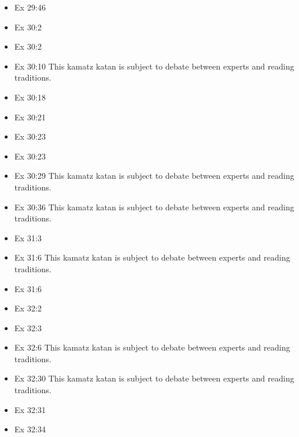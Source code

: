 \documentclass[14pt]{article}
\begin{document}
\begin{multicols}{2}
\begin{itemize}
\item Ex 29:46

\item Ex 30:2

\item Ex 30:2

\item Ex 30:10 This kamatz katan is subject to debate between experts and reading traditions.

\item Ex 30:18

\item Ex 30:21

\item Ex 30:23

\item Ex 30:23

\item Ex 30:29 This kamatz katan is subject to debate between experts and reading traditions.

\item Ex 30:36 This kamatz katan is subject to debate between experts and reading traditions.

\item Ex 31:3

\item Ex 31:6 This kamatz katan is subject to debate between experts and reading traditions.

\item Ex 31:6

\item Ex 32:2

\item Ex 32:3

\item Ex 32:6 This kamatz katan is subject to debate between experts and reading traditions.

\item Ex 32:30 This kamatz katan is subject to debate between experts and reading traditions.

\item Ex 32:31

\item Ex 32:34


\end{itemize}
\end{multicols}
\end{document}

